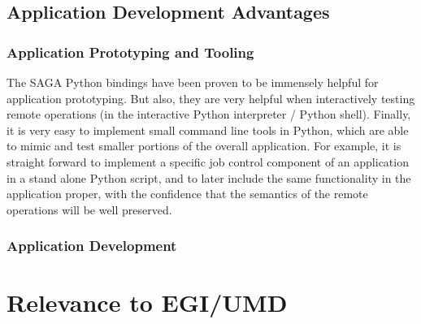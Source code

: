 \documentclass[12pt]{article}
\begin{document}
\subsection{Application Development Advantages}

\subsubsection*{Application Prototyping and Tooling}

The SAGA Python bindings have been proven to be immensely helpful for
application prototyping.  But also, they are very helpful when
interactively testing remote operations (in the interactive Python
interpreter / Python shell).  Finally, it is very easy to implement
small command line tools in Python, which are able to mimic and test
smaller portions of the overall application.  For example, it is
straight forward to implement a specific job control component of an
application in a stand alone Python script, and to later include the
same functionality in the application proper, with the confidence that
the semantics of the remote operations will be well
preserved. %

\subsubsection*{Application Development}






\section{Relevance to EGI/UMD}
\end{document}
